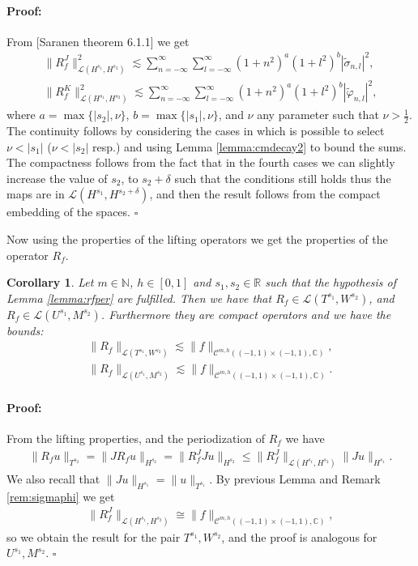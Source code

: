 \documentclass{article}
\newtheorem{corollary}[theorem]{Corollary}
\newenvironment{proof}{\paragraph{Proof:}}{\hfill$\square$}
\newcommand{\todo}[1]{{\color{red}[#1]}}
\newcommand{\IC}{{\mathbb C}}
\newcommand{\IN}{{\mathbb N}}
\newcommand{\IR}{{\mathbb R}}
\newcommand{\cmspaceh}[4]{\mathcal{C}^{#1,#2} \left( #3, #4 \right)}
\newcommand{\iinterv}{(-1,1)\times(-1,1)}
\begin{document}
\begin{proof}
From \todo{Saranen theorem 6.1.1} we get
\begin{align*}
\| R^J_f\|_{ \mathcal{L}(H^{s_1},H^{s_2})}^2 \lesssim \sum_{n=-\infty}^\infty \sum_{l=-\infty}^\infty  (1+n^2)^{a}(1+l^2)^{b}|\widetilde{\sigma}_{n,l}|^2,\\
\| R^K_f\|_{ \mathcal{L}(H^{s_1},H^{s_2})}^2 \lesssim \sum_{n=-\infty}^\infty \sum_{l=-\infty}^\infty  (1+n^2)^{a}(1+l^2)^{b}|\widetilde{\varphi}_{n,l}|^2,
\end{align*}
where $a = \max\{|s_2|, \nu\}$, $b = \max\{|s_1|, \nu\} $, and $\nu$ any parameter such that $\nu > \frac{1}{2}$. The continuity follows by considering the cases in which is possible to select $\nu < |s_1|$ ($\nu < |s_2|$ resp.) and using Lemma \ref{lemma:cmdecay2} to bound the sums. 
The compactness follows from the fact that in the fourth cases we can slightly increase the value of $s_2$, to $s_2 + \delta$  such that the conditions still holds thus the maps are in $\mathcal{L}(H^{s_1},H^{s_2+\delta})$, and then the result follows from the compact embedding of the spaces. 
\end{proof}

Now using the properties of the lifting operators we get the properties of the operator $R_f$. 

\begin{corollary}
\label{corollary:rfop}
Let $m \in \IN$, $h \in [0,1]$ and $s_1, s_2  \in \IR$ such that the hypothesis of Lemma \ref{lemma:rfper} are fulfilled. Then we have that 
$R_f  \in \mathcal{L}(T^{s_1},W^{s_2})$, and $R_f \in \mathcal{L}(U^{s_1},M^{s_2})$. Furthermore they are compact operators and we have the bounds:
\begin{align*}
\| R_f\|_{ \mathcal{L}(T^{s_1},W^{s_2})} \lesssim \|f\|_{\cmspaceh{m}{h}{\iinterv}{\IC}},\\
\| R_f\|_{ \mathcal{L}(U^{s_1},M^{s_2})} \lesssim \|f\|_{\cmspaceh{m}{h}{\iinterv}{\IC}}.
\end{align*}
\end{corollary}
\begin{proof}
From the lifting properties, and the periodization of $R_f$ we have 
\begin{align*}
\| R_f u\|_{T^{s_2}} = \|  J R_f u \|_{H^{s_2}} = \|R_f^J Ju \|_{H^{s_2}} \leq \| R_f^J\|_{\mathcal{L}(H^{s_1},H^{s_2})} \|J u \|_{H^{s_1}}. 
\end{align*}
We also recall that $\|J u \|_{H^{s_1}} = \|u\|_{T^{s_1}}$. By previous Lemma and Remark \ref{rem:sigmaphi} we get 
\begin{align*}
\| R_f^J\|_{\mathcal{L}(H^{s_1},H^{s_2})} \cong \|f\|_{\cmspaceh{m}{h}{\iinterv}{\IC}},
\end{align*}
so we obtain the result for the pair $T^{s_1}, W^{s_2}$, and the proof is analogous for $U^{s_1},M^{s_2}$.
\end{proof}
\end{document}
